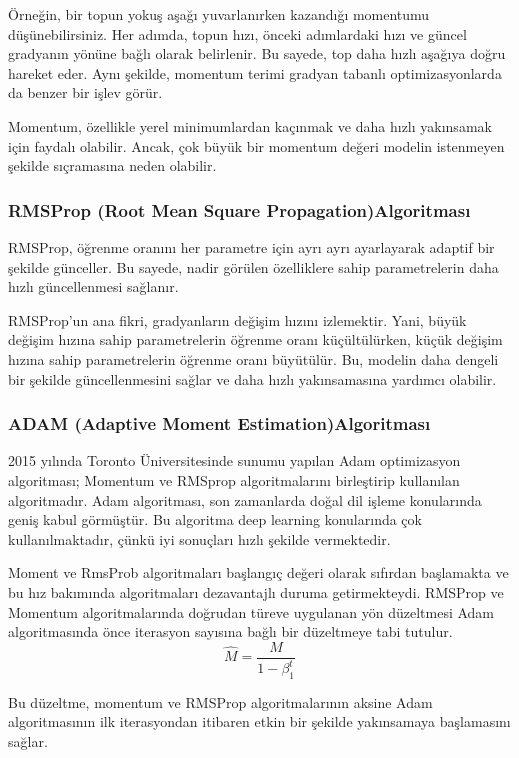 \documentclass[12pt]{article}
\begin{document}
Örneğin, bir topun yokuş aşağı yuvarlanırken kazandığı momentumu düşünebilirsiniz. Her adımda, topun hızı, önceki adımlardaki hızı ve güncel gradyanın yönüne bağlı olarak belirlenir. Bu sayede, top daha hızlı aşağıya doğru hareket eder. Aynı şekilde, momentum terimi gradyan tabanlı optimizasyonlarda da benzer bir işlev görür.

Momentum, özellikle yerel minimumlardan kaçınmak ve daha hızlı yakınsamak için faydalı olabilir. Ancak, çok büyük bir momentum değeri modelin istenmeyen şekilde sıçramasına neden olabilir.
\subsubsection{RMSProp (Root Mean Square Propagation)Algoritması}
RMSProp, öğrenme oranını her parametre için ayrı ayrı ayarlayarak adaptif bir şekilde günceller. Bu sayede, nadir görülen özelliklere sahip parametrelerin daha hızlı güncellenmesi sağlanır.

RMSProp'un ana fikri, gradyanların değişim hızını izlemektir. Yani, büyük değişim hızına sahip parametrelerin öğrenme oranı küçültülürken, küçük değişim hızına sahip parametrelerin öğrenme oranı büyütülür. Bu, modelin daha dengeli bir şekilde güncellenmesini sağlar ve daha hızlı yakınsamasına yardımcı olabilir.

\subsubsection{ADAM (Adaptive Moment Estimation)Algoritması}
2015 yılında Toronto Üniversitesinde sunumu yapılan Adam optimizasyon algoritması; Momentum ve RMSprop algoritmalarını birleştirip kullanılan algoritmadır. Adam algoritması, son zamanlarda doğal dil işleme konularında geniş kabul görmüştür. Bu algoritma deep learning konularında çok kullanılmaktadır, çünkü iyi sonuçları hızlı şekilde vermektedir.

Moment ve RmsProb algoritmaları başlangıç değeri olarak sıfırdan başlamakta ve bu hız bakımında algoritmaları dezavantajlı duruma getirmekteydi. RMSProp ve Momentum algoritmalarında doğrudan türeve uygulanan yön düzeltmesi Adam algoritmasında önce iterasyon sayısına bağlı bir düzeltmeye tabi tutulur.
\[
\hat{M} = \frac{M}{1 - \beta_1^t}
\]


Bu düzeltme, momentum ve RMSProp algoritmalarının aksine Adam algoritmasının ilk iterasyondan itibaren etkin bir şekilde yakınsamaya başlamasını sağlar.\\
\end{document}
